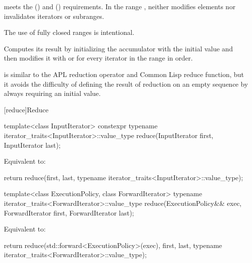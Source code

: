 \begin{itemdescr}
\pnum
\expects
{} meets
the  ()
and  () requirements.
In the range ,
 neither modifies elements
nor invalidates iterators or subranges.
\begin{footnote}
The use of fully closed ranges is intentional.
\end{footnote}

\pnum
\effects
Computes its result by
initializing the accumulator  with the initial value 
and then modifies it with
 or
for every iterator  in the range  in order.
\begin{footnote}
 is similar
to the APL reduction operator and Common Lisp reduce function,
but it avoids the difficulty of defining the result of reduction
on an empty sequence by always requiring an initial value.
\end{footnote}
\end{itemdescr}

[reduce]{Reduce}

%
\begin{itemdecl}
template<class InputIterator>
  constexpr typename iterator_traits<InputIterator>::value_type
    reduce(InputIterator first, InputIterator last);
\end{itemdecl}

\begin{itemdescr}
\pnum
\effects
Equivalent to:
\begin{codeblock}
return reduce(first, last,
              typename iterator_traits<InputIterator>::value_type{});
\end{codeblock}
\end{itemdescr}

%
\begin{itemdecl}
template<class ExecutionPolicy, class ForwardIterator>
  typename iterator_traits<ForwardIterator>::value_type
    reduce(ExecutionPolicy&& exec,
           ForwardIterator first, ForwardIterator last);
\end{itemdecl}

\begin{itemdescr}
\pnum
\effects
Equivalent to:
\begin{codeblock}
return reduce(std::forward<ExecutionPolicy>(exec), first, last,
              typename iterator_traits<ForwardIterator>::value_type{});
\end{codeblock}
\end{itemdescr}


